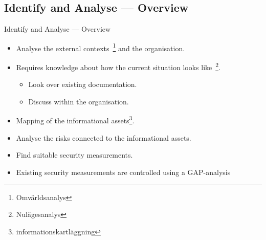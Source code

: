 \documentclass{beamer}
\begin{document}
\subsection{Identify and Analyse --- Overview}
\begin{frame}{Identify and Analyse --- Overview}
  \begin{itemize}
    \item Analyse the external contexts~\footnote{Omvärldsanalys} and the organisation.
    \item Requires knowledge about how the current situation looks
      like~\footnote{Nulägesanalys}.
      \begin{itemize}
        \item Look over existing documentation.
        \item Discuss within the organisation.
      \end{itemize}
    \item Mapping of the informational assets\footnote{informationskartläggning}.
    \item Analyse the risks connected to the informational assets.
    \item Find suitable security measurements.
    \item Existing security measurements are controlled using a GAP-analysis
  \end{itemize}
\end{frame}
\end{document}
